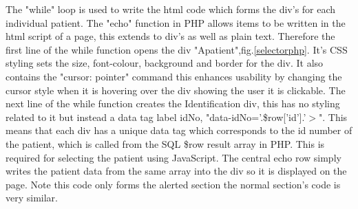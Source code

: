 \documentclass[11pt]{article}
\begin{document}
The "while" loop is used to write the html code which forms the div's for each individual patient. The "echo" function in PHP allows items to be written in the html script of a page, this extends to div's as well as plain text. Therefore the first line of the while function opens the div "Apatient",fig.\ref{selectorphp}. It's CSS styling sets the size, font-colour, background and border for the div. It also contains the "cursor: pointer" command this enhances usability by changing the cursor style when it is hovering over the div showing the user it is clickable. The next line of the while function creates the Identification div, this has no styling related to it but instead a data tag label idNo, "data-idNo='.\$row['id'].'$>$". This means that each div has a unique data tag which corresponds to the id number of the patient, which is called from the SQL \$row result array in PHP. This is required for selecting the patient using JavaScript. The central echo row simply writes the patient data from the same array into the div so it is displayed on the page. Note this code only forms the alerted section the normal section's code is very similar. 
\end{document}
